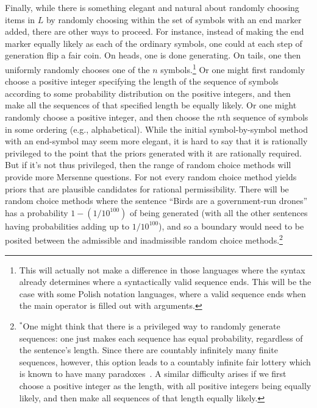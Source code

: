 Finally, while there is something elegant and natural about randomly choosing items in $L$ by randomly choosing within the
set of symbols with an end marker added, there are other ways to proceed. For instance, instead of making the end marker
equally likely as each of the ordinary symbols, one could at each step of generation flip a fair coin. On heads, one is done
generating. On tails, one then uniformly randomly chooses one of the $n$ symbols.\footnote{This will actually not make a 
difference in those languages where the syntax already determines where a syntactically valid sequence ends. This will be the
case with some Polish notation languages, where a valid sequence ends when the main operator is filled out with arguments.}
Or one might first randomly choose a positive integer specifying the length of the sequence of symbols according to some
probability distribution on the positive integers, and then make all the sequences of that specified length be equally likely. 
Or one might randomly choose a positive integer, and then choose the $n$th sequence of symbols in some ordering (e.g., alphabetical).
While the initial symbol-by-symbol method with an end-symbol may seem more elegant, it is hard to say that it is rationally
privileged to the point that the priors generated with it are rationally required. But if it's not thus privileged, then the
range of random choice methods will provide more Mersenne questions. For not every random choice method yields priors that
are plausible candidates for rational permissibility. There will be random choice methods where the sentence ``Birds are a government-run 
drones'' has a probability $1-(1/10^{100})$ of being generated (with all the other sentences having probabilities adding
up to $1/10^{100}$), and so a boundary would need to be
posited between the admissible and inadmissible random choice methods.\footnote{$^*$One might think that there is a 
privileged way to randomly generate sequences: one just makes each sequence has equal probability, regardless of the
sentence's length. Since there are countably infinitely many finite sequences, however, this option leads to a countably infinite fair
lottery which is known to have many paradoxes~\parencite[Chapter~4]{PrussInfinity}. A similar difficulty arises if we first choose a positive integer
as the length, with all positive integers being equally likely, and then make all sequences of that length equally likely.}

